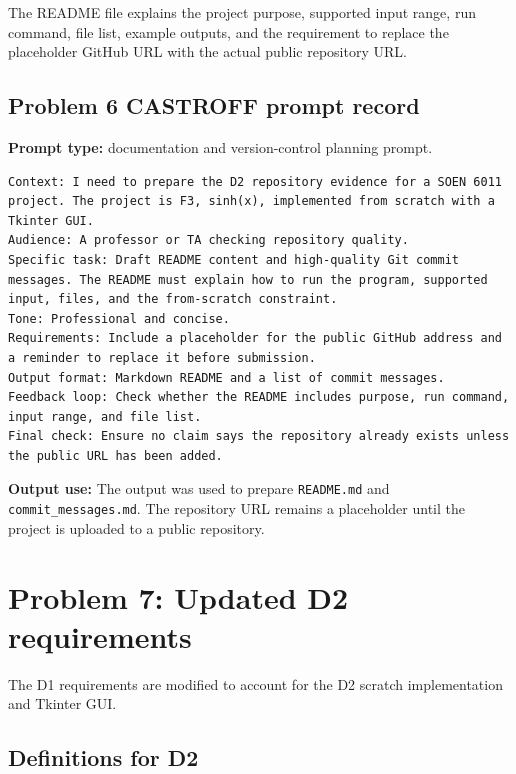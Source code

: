 \documentclass[11pt]{article}
\begin{document}
The README file explains the project purpose, supported input range, run command, file list, example outputs, and the requirement to replace the placeholder GitHub URL with the actual public repository URL.

\subsection{Problem 6 CASTROFF prompt record}

\textbf{Prompt type:} documentation and version-control planning prompt.

\begin{lstlisting}[style=textstyle]
Context: I need to prepare the D2 repository evidence for a SOEN 6011 project. The project is F3, sinh(x), implemented from scratch with a Tkinter GUI.
Audience: A professor or TA checking repository quality.
Specific task: Draft README content and high-quality Git commit messages. The README must explain how to run the program, supported input, files, and the from-scratch constraint.
Tone: Professional and concise.
Requirements: Include a placeholder for the public GitHub address and a reminder to replace it before submission.
Output format: Markdown README and a list of commit messages.
Feedback loop: Check whether the README includes purpose, run command, input range, and file list.
Final check: Ensure no claim says the repository already exists unless the public URL has been added.
\end{lstlisting}

\textbf{Output use:} The output was used to prepare \texttt{README.md} and \texttt{commit\_messages.md}. The repository URL remains a placeholder until the project is uploaded to a public repository.

\section{Problem 7: Updated D2 requirements}

The D1 requirements are modified to account for the D2 scratch implementation and Tkinter GUI.

\subsection{Definitions for D2}
\end{document}
